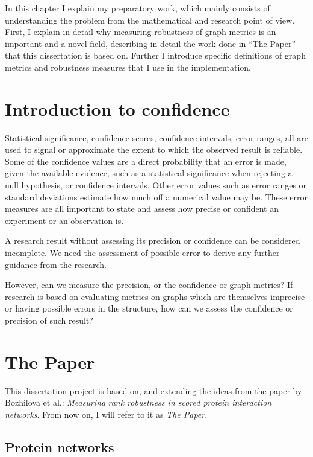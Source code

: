 In this chapter I explain my preparatory work, which mainly consists of understanding the problem from the mathematical and research point of view.
First, I explain in detail why measuring robustness of graph metrics is an important and a novel field, describing in detail the work done in ``The Paper'' that this dissertation is based on.
Further I introduce specific definitions of graph metrics and robustness measures that I use in the implementation.


\section{Introduction to confidence}

Statistical significance, confidence scores, confidence intervals, error ranges, all are used to signal or approximate the extent to which the observed result is reliable.
Some of the confidence values are a direct probability that an error is made, given the available evidence, such as a statistical significance when rejecting a null hypothesis, or confidence intervals.
Other error values such as error ranges or standard deviations estimate how much off a numerical value may be.
These error measures are all important to state and assess how precise or confident an experiment or an observation is.

A research result without assessing its precision or confidence can be considered incomplete.
We need the assessment of possible error to derive any further guidance from the research.\citeneeded

However, can we measure the precision, or the confidence or graph metrics?
If research is based on evaluating metrics on graphs which are themselves imprecise or having possible errors in the structure, how can we assess the confidence or precision of such result?


\section{The Paper}

This dissertation project is based on, and extending the ideas from the paper by Bozhilova et al.: \textsl{Measuring rank robustness in scored protein interaction networks}\cite{Bozhilova2019}.
From now on, I will refer to it as \textsl{The Paper}.

\subsection{Protein networks}

